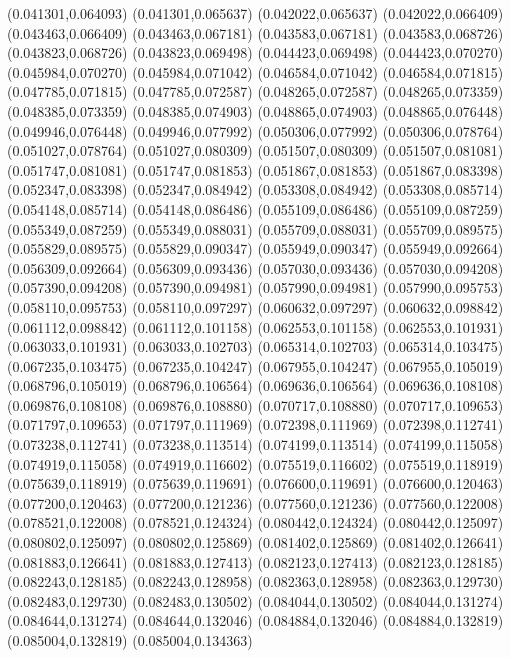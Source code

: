 (0.041301,0.064093)
(0.041301,0.065637)
(0.042022,0.065637)
(0.042022,0.066409)
(0.043463,0.066409)
(0.043463,0.067181)
(0.043583,0.067181)
(0.043583,0.068726)
(0.043823,0.068726)
(0.043823,0.069498)
(0.044423,0.069498)
(0.044423,0.070270)
(0.045984,0.070270)
(0.045984,0.071042)
(0.046584,0.071042)
(0.046584,0.071815)
(0.047785,0.071815)
(0.047785,0.072587)
(0.048265,0.072587)
(0.048265,0.073359)
(0.048385,0.073359)
(0.048385,0.074903)
(0.048865,0.074903)
(0.048865,0.076448)
(0.049946,0.076448)
(0.049946,0.077992)
(0.050306,0.077992)
(0.050306,0.078764)
(0.051027,0.078764)
(0.051027,0.080309)
(0.051507,0.080309)
(0.051507,0.081081)
(0.051747,0.081081)
(0.051747,0.081853)
(0.051867,0.081853)
(0.051867,0.083398)
(0.052347,0.083398)
(0.052347,0.084942)
(0.053308,0.084942)
(0.053308,0.085714)
(0.054148,0.085714)
(0.054148,0.086486)
(0.055109,0.086486)
(0.055109,0.087259)
(0.055349,0.087259)
(0.055349,0.088031)
(0.055709,0.088031)
(0.055709,0.089575)
(0.055829,0.089575)
(0.055829,0.090347)
(0.055949,0.090347)
(0.055949,0.092664)
(0.056309,0.092664)
(0.056309,0.093436)
(0.057030,0.093436)
(0.057030,0.094208)
(0.057390,0.094208)
(0.057390,0.094981)
(0.057990,0.094981)
(0.057990,0.095753)
(0.058110,0.095753)
(0.058110,0.097297)
(0.060632,0.097297)
(0.060632,0.098842)
(0.061112,0.098842)
(0.061112,0.101158)
(0.062553,0.101158)
(0.062553,0.101931)
(0.063033,0.101931)
(0.063033,0.102703)
(0.065314,0.102703)
(0.065314,0.103475)
(0.067235,0.103475)
(0.067235,0.104247)
(0.067955,0.104247)
(0.067955,0.105019)
(0.068796,0.105019)
(0.068796,0.106564)
(0.069636,0.106564)
(0.069636,0.108108)
(0.069876,0.108108)
(0.069876,0.108880)
(0.070717,0.108880)
(0.070717,0.109653)
(0.071797,0.109653)
(0.071797,0.111969)
(0.072398,0.111969)
(0.072398,0.112741)
(0.073238,0.112741)
(0.073238,0.113514)
(0.074199,0.113514)
(0.074199,0.115058)
(0.074919,0.115058)
(0.074919,0.116602)
(0.075519,0.116602)
(0.075519,0.118919)
(0.075639,0.118919)
(0.075639,0.119691)
(0.076600,0.119691)
(0.076600,0.120463)
(0.077200,0.120463)
(0.077200,0.121236)
(0.077560,0.121236)
(0.077560,0.122008)
(0.078521,0.122008)
(0.078521,0.124324)
(0.080442,0.124324)
(0.080442,0.125097)
(0.080802,0.125097)
(0.080802,0.125869)
(0.081402,0.125869)
(0.081402,0.126641)
(0.081883,0.126641)
(0.081883,0.127413)
(0.082123,0.127413)
(0.082123,0.128185)
(0.082243,0.128185)
(0.082243,0.128958)
(0.082363,0.128958)
(0.082363,0.129730)
(0.082483,0.129730)
(0.082483,0.130502)
(0.084044,0.130502)
(0.084044,0.131274)
(0.084644,0.131274)
(0.084644,0.132046)
(0.084884,0.132046)
(0.084884,0.132819)
(0.085004,0.132819)
(0.085004,0.134363)
